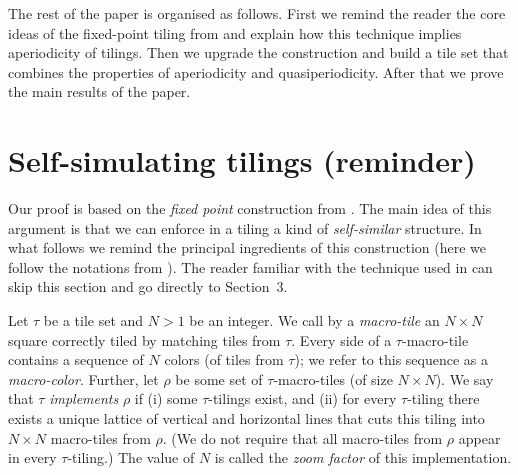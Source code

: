\documentclass[runningheads]{llncs}
\begin{document}
The rest of the paper is organised as follows. First we remind the reader the core ideas of the fixed-point tiling from \cite{drs} and explain how this technique implies aperiodicity of tilings. Then we upgrade the construction and build a tile set that combines the properties of aperiodicity and quasiperiodicity. After that we prove the main results of the paper.
 


\section{Self-simulating tilings (reminder)}
Our proof is based on the \emph{fixed point} construction from \cite{drs}. The main idea of this argument is that we can enforce in a tiling a kind of   \emph{self-similar} structure.  In what follows we remind the principal ingredients of this construction (here we follow the notations from \cite{drs}).
The reader familiar with the technique used in  \cite{drs} can skip this section and go directly to Section~3.


 Let $\tau$ be a tile set and $N>1$ be an integer. We call by a \emph{macro-tile} an $N \times N $ square correctly tiled by matching tiles from $\tau$. Every side of a $\tau$-macro-tile contains  a sequence of $N$ colors (of tiles from $\tau$); we refer to this sequence as a \emph{macro-color}.
Further, let $\rho$ be some set of $\tau$-macro-tiles (of size $N\times N$). We say that $\tau$ \emph{implements} $\rho$ if (i) some $\tau$-tilings exist, and (ii) for every $\tau$-tiling there exists a unique lattice of vertical and horizontal lines that cuts this tiling into $N\times N$ macro-tiles from $\rho$. (We do not require that all macro-tiles from $\rho$ appear in every $\tau$-tiling.) The value of $N$ is called the  \emph{zoom factor} of this implementation.
  
\end{document}
